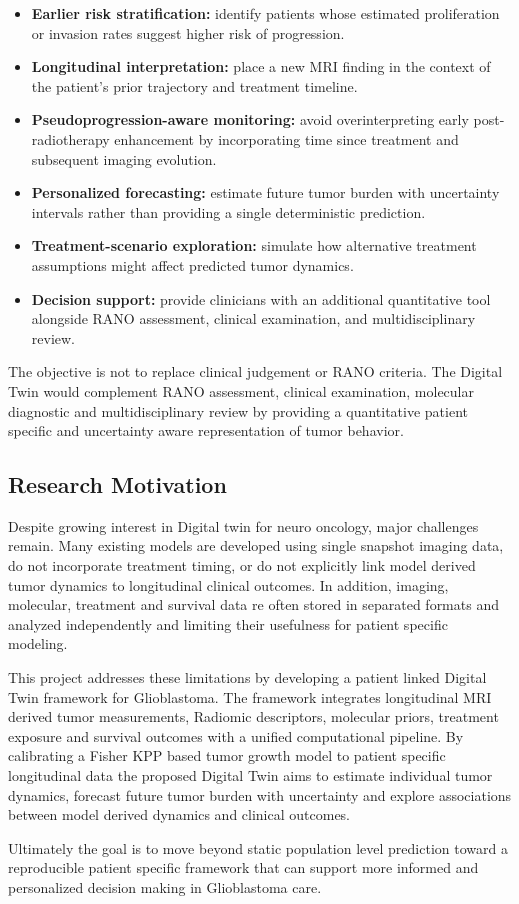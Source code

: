 \begin{itemize}
    \item \textbf{Earlier risk stratification:} identify patients whose estimated proliferation or invasion rates suggest higher risk of progression.
    \item \textbf{Longitudinal interpretation:} place a new MRI finding in the context of the patient's prior trajectory and treatment timeline.
    \item \textbf{Pseudoprogression-aware monitoring:} avoid overinterpreting early post-radiotherapy enhancement by incorporating time since treatment and subsequent imaging evolution.
    \item \textbf{Personalized forecasting:} estimate future tumor burden with uncertainty intervals rather than providing a single deterministic prediction.
    \item \textbf{Treatment-scenario exploration:} simulate how alternative treatment assumptions might affect predicted tumor dynamics.
    \item \textbf{Decision support:} provide clinicians with an additional quantitative tool alongside RANO assessment, clinical examination, and multidisciplinary review.
\end{itemize}

The objective is not to replace clinical judgement or RANO criteria. The Digital Twin would complement RANO assessment, clinical examination, molecular diagnostic and multidisciplinary review by providing a quantitative  patient specific and uncertainty aware representation of tumor behavior.

\subsection{Research Motivation}

Despite growing interest in Digital twin for neuro oncology, major challenges remain. Many existing models are developed using single snapshot imaging data, do not incorporate treatment timing, or do not explicitly link model derived tumor dynamics to longitudinal clinical outcomes. In addition, imaging, molecular, treatment and survival data re often stored in separated formats and analyzed independently and limiting their usefulness for patient specific modeling.

This project addresses these limitations by developing a patient linked Digital Twin framework for Glioblastoma. The framework integrates longitudinal MRI derived tumor measurements, Radiomic descriptors, molecular priors, treatment exposure and survival outcomes with a unified computational pipeline. By calibrating a Fisher KPP based tumor growth model to patient specific longitudinal data the proposed Digital Twin aims to estimate individual tumor dynamics, forecast future tumor burden with uncertainty and explore associations between model derived dynamics and clinical outcomes.

Ultimately the goal is to move beyond static population level prediction toward a reproducible patient specific framework that can support more informed and personalized decision making in Glioblastoma care.

